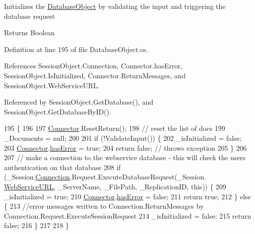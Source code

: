 Initializes the \hyperlink{class_database_object}{Database\+Object} by validating the input and triggering the database request 

\begin{DoxyReturn}{Returns}
Boolean
\end{DoxyReturn}


Definition at line 195 of file Database\+Object.\+cs.



References Session\+Object.\+Connection, Connector.\+has\+Error, Session\+Object.\+Is\+Initialized, Connector.\+Return\+Messages, and Session\+Object.\+Web\+Service\+U\+RL.



Referenced by Session\+Object.\+Get\+Database(), and Session\+Object.\+Get\+Database\+By\+I\+D().


\begin{DoxyCode}
195                              \{
196 
197         \hyperlink{class_connector}{Connector}.ResetReturn();
198         \textcolor{comment}{// reset the list of docs}
199         \_Documents = null;
200 
201         \textcolor{keywordflow}{if} (!ValidateInput()) \{
202             \_isInitialized = \textcolor{keyword}{false};
203             \hyperlink{class_connector}{Connector}.\hyperlink{class_connector_a079bae21a5417efa53bfe8954c0f533f}{hasError} = \textcolor{keyword}{true};
204             \textcolor{keywordflow}{return} \textcolor{keyword}{false};   \textcolor{comment}{// throws exception}
205         \}
206 
207         \textcolor{comment}{// make a connection to the webservice database - this will check the users authentication on that
       database}
208         \textcolor{keywordflow}{if} (\_Session.\hyperlink{class_session_object_a014bdbf705a753540e19bfb53030c55c}{Connection}.Request.ExecuteDatabaseRequest(\_Session.
      \hyperlink{class_session_object_a697c071c812fbf7ad1166b896fb44c16}{WebServiceURL}, \_ServerName, \_FilePath, \_ReplicationID, \textcolor{keyword}{this})) \{
209             \_isInitialized = \textcolor{keyword}{true};
210             \hyperlink{class_connector}{Connector}.\hyperlink{class_connector_a079bae21a5417efa53bfe8954c0f533f}{hasError} = \textcolor{keyword}{false};
211             \textcolor{keywordflow}{return} \textcolor{keyword}{true};
212         \} \textcolor{keywordflow}{else} \{
213             \textcolor{comment}{//error messages written to Connection.ReturnMessages by
       Connection.Request.ExecuteSessionRequest}
214             \_isInitialized = \textcolor{keyword}{false};
215             \textcolor{keywordflow}{return} \textcolor{keyword}{false};
216         \}
217                 
218     \}
\end{DoxyCode}
\mbox{\label{class_database_object_a88ae0bcda671009e2742858ab945a18c}} 

